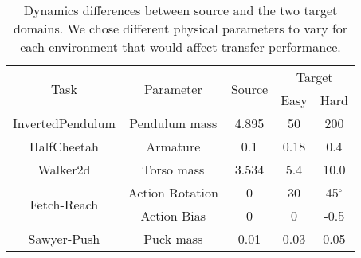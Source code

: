 \begin{table}[t]
\centering
\begin{tabular}{ ccccc } 
 \toprule
 \multirow{2}{7.5em}{\centering Task} & \multirow{2}{6.5em}{\centering Parameter} & \multirow{2}{3em}{\centering Source} & \multicolumn{2}{c}{Target} \\ 
 & & & Easy & Hard \\
 \midrule
 InvertedPendulum & Pendulum mass & 4.895 & 50 & 200 \\ 
 \midrule
 HalfCheetah & Armature & 0.1 & 0.18 & 0.4 \\ 
 \midrule
 Walker2d & Torso mass & 3.534 & 5.4 & 10.0 \\ 
 \midrule
 \multirow{2}{7.5em}{\centering Fetch-Reach} & Action Rotation & 0 & 30 & 45$^{\circ}$\\
 & Action Bias & 0 & 0 & -0.5 \\
 \midrule
 Sawyer-Push & Puck mass & 0.01 & 0.03 & 0.05 \\
 \bottomrule
\end{tabular}
\vspace{1em}
\caption{Dynamics differences between source and the two target domains.  We chose different physical parameters to vary for each environment that would affect transfer performance.}
\label{tab:dynamics-diff}
\end{table}


